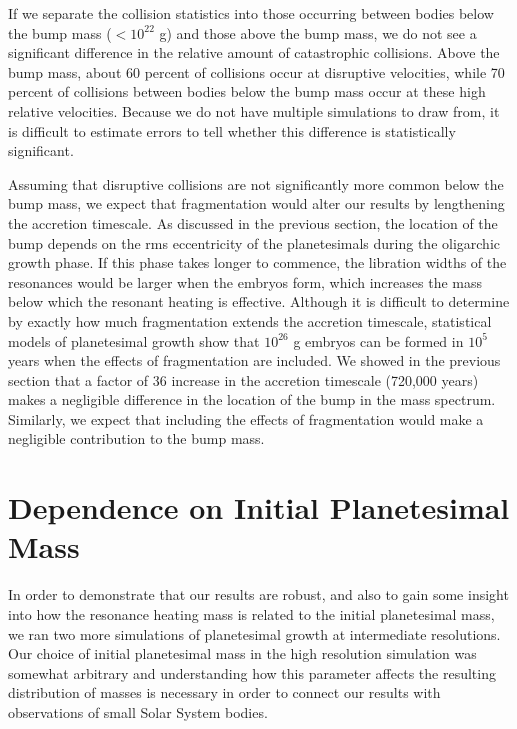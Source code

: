 If we separate the collision statistics into those occurring between bodies below the bump mass ($< 10^{22}$ g) and those 
above the bump mass, we do not see a significant difference in the relative amount of catastrophic collisions. Above the bump 
mass, about 60 percent of collisions occur at disruptive velocities, while 70 percent of collisions between bodies below the bump 
mass occur at these high relative velocities. Because we do not have multiple simulations to draw from, it is difficult to estimate 
errors to tell whether this difference is statistically significant.

Assuming that disruptive collisions are not significantly more common below the bump mass, we expect that fragmentation 
would alter our results by lengthening the accretion timescale. As discussed in the previous section, the location of the bump 
depends on the rms eccentricity of the planetesimals during the oligarchic growth phase. If this phase takes longer to 
commence, the libration widths of the resonances would be larger when the embryos form, which increases the mass below 
which the resonant heating is effective. Although it is difficult to determine by exactly how much fragmentation extends the 
accretion timescale, statistical models of planetesimal growth show that $10^{26}$ g embryos can be formed in $10^{5}$ years 
\cite{wetherill93} when the effects of fragmentation are included. We showed in the previous section that a factor of 36 increase 
in the accretion timescale (720,000 years) makes a negligible difference in the location of the bump in the mass spectrum. 
Similarly, we expect that including the effects of fragmentation would make a negligible contribution to the bump mass.

\section{Dependence on Initial Planetesimal Mass}\label{sec:intermed}

In order to demonstrate that our results are robust, and also to gain some insight into how the resonance heating mass is related 
to the initial planetesimal mass, we ran two more simulations of planetesimal growth at intermediate resolutions. Our choice of 
initial planetesimal mass in the high resolution simulation was somewhat arbitrary and understanding how this parameter affects 
the resulting distribution of masses is necessary in order to connect our results with observations of small Solar System bodies.

